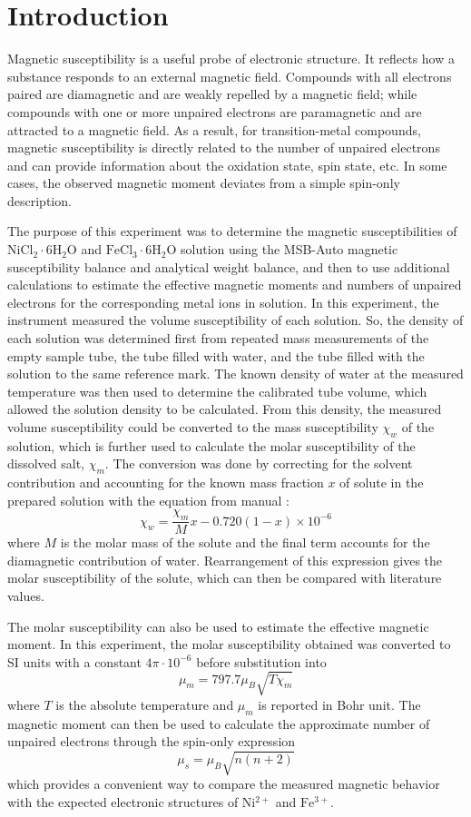\documentclass[12pt]{article}
\begin{document}
\section*{Introduction}
Magnetic susceptibility is a useful probe of electronic structure. It reflects how a substance responds to an external magnetic field. Compounds with all electrons paired are diamagnetic and are weakly repelled by a magnetic field; while compounds with one or more unpaired electrons are paramagnetic and are attracted to a magnetic field. As a result, for transition-metal compounds, magnetic susceptibility is directly related to the number of unpaired electrons and can provide information about the oxidation state, spin state, etc. In some cases, the observed magnetic moment deviates from a simple spin-only description.\cite{lab_manual}

The purpose of this experiment was to determine the magnetic susceptibilities of \(\mathrm{NiCl_2\cdot 6H_2O}\) and \(\mathrm{FeCl_3\cdot 6H_2O}\) solution using the MSB-Auto magnetic susceptibility balance and analytical weight balance, and then to use additional calculations to estimate the effective magnetic moments and numbers of unpaired electrons for the corresponding metal ions in solution. In this experiment, the instrument measured the volume susceptibility of each solution. So, the density of each solution was determined first from repeated mass measurements of the empty sample tube, the tube filled with water, and the tube filled with the solution to the same reference mark. The known density of water at the measured temperature was then used to determine the calibrated tube volume, which allowed the solution density to be calculated. From this density, the measured volume susceptibility could be converted to the mass susceptibility \(\chi_w\) of the solution, which is further used to calculate the molar susceptibility of the dissolved salt, \(\chi_m\). The conversion was done by correcting for the solvent contribution and accounting for the known mass fraction \(x\) of solute in the prepared solution with the equation from manual \cite{lab_manual}:
\[
\chi_w=\frac{\chi_m}{M}x-0.720(1-x)\times10^{-6}
\]
where \(M\) is the molar mass of the solute and the final term accounts for the diamagnetic contribution of water. Rearrangement of this expression gives the molar susceptibility of the solute, which can then be compared with literature values.

The molar susceptibility can also be used to estimate the effective magnetic moment. In this experiment, the molar susceptibility obtained was converted to SI units with a constant $4\pi\cdot10^{-6}$ before substitution into \cite{lab_manual}
\[
\mu_m = 797.7\mu_B\sqrt{T\chi_m}
\]
where \(T\) is the absolute temperature and \(\mu_m\) is reported in Bohr unit. The magnetic moment can then be used to calculate the approximate number of unpaired electrons through the spin-only expression
\[
\mu_s=\mu_B\sqrt{n(n+2)}
\]
which provides a convenient way to compare the measured magnetic behavior with the expected electronic structures of \(\mathrm{Ni^{2+}}\) and \(\mathrm{Fe^{3+}}\). 
\end{document}
